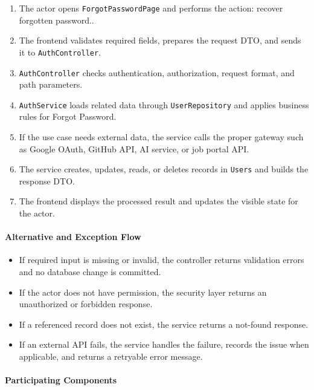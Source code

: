 \begin{enumerate}
    \item The actor opens \texttt{ForgotPasswordPage} and performs the action: recover forgotten password..
    \item The frontend validates required fields, prepares the request DTO, and sends it to \texttt{AuthController}.
    \item \texttt{AuthController} checks authentication, authorization, request format, and path parameters.
    \item \texttt{AuthService} loads related data through \texttt{UserRepository} and applies business rules for Forgot Password.
    \item If the use case needs external data, the service calls the proper gateway such as Google OAuth, GitHub API, AI service, or job portal API.
    \item The service creates, updates, reads, or deletes records in \texttt{Users} and builds the response DTO.
    \item The frontend displays the processed result and updates the visible state for the actor.
\end{enumerate}

\paragraph{Alternative and Exception Flow}

\begin{itemize}
    \item If required input is missing or invalid, the controller returns validation errors and no database change is committed.
    \item If the actor does not have permission, the security layer returns an unauthorized or forbidden response.
    \item If a referenced record does not exist, the service returns a not-found response.
    \item If an external API fails, the service handles the failure, records the issue when applicable, and returns a retryable error message.
\end{itemize}

\paragraph{Participating Components}


